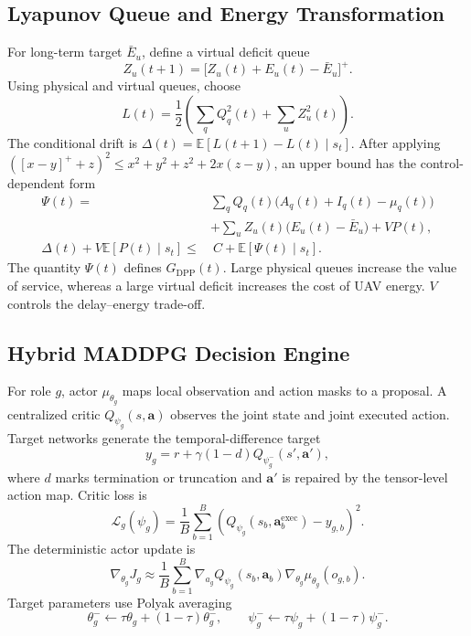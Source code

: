 \documentclass[journal]{IEEEtran}
\newcommand{\vect}[1]{\boldsymbol{#1}}
\newcommand{\E}{\mathbb{E}}
\begin{document}
\subsection{Lyapunov Queue and Energy Transformation}
For long-term target $\bar E_u$, define a virtual deficit queue
\begin{equation}
Z_u(t+1)=\big[Z_u(t)+E_u(t)-\bar E_u\big]^+.
\end{equation}
Using physical and virtual queues, choose
\begin{equation}
L(t)=\frac{1}{2}\left(\sum_q Q_q^2(t)+\sum_u Z_u^2(t)\right).
\end{equation}
The conditional drift is
$\Delta(t)=\E[L(t+1)-L(t)\mid s_t]$. After applying
$([x-y]^++z)^2\le x^2+y^2+z^2+2x(z-y)$, an upper bound has the control-dependent
form
\begin{align}
\Psi(t)=&\sum_q Q_q(t)
\big(A_q(t)+I_q(t)-\mu_q(t)\big)\nonumber\\
&+\sum_u Z_u(t)\big(E_u(t)-\bar E_u\big)+VP(t),\\
\Delta(t)+V\E[P(t)\mid s_t]
\le&\ C+\E[\Psi(t)\mid s_t].
\label{eq:dpp}
\end{align}
The quantity $\Psi(t)$ defines $G_{\mathrm{DPP}}(t)$. Large physical queues
increase the value of service, whereas a large virtual deficit increases the
cost of UAV energy. $V$ controls the delay--energy trade-off.

\subsection{Hybrid MADDPG Decision Engine}
For role $g$, actor $\mu_{\theta_g}$ maps local observation and action masks
to a proposal. A centralized critic
$Q_{\psi_g}(s,\vect a)$ observes the joint state and joint executed action.
Target networks generate the temporal-difference target
\begin{equation}
y_g=r+\gamma(1-d)Q_{\psi_g^-}
\left(s',\vect a'\right),
\end{equation}
where $d$ marks termination or truncation and $\vect a'$ is repaired by the
tensor-level action map. Critic loss is
\begin{equation}
\mathcal L_g(\psi_g)=\frac{1}{B}\sum_{b=1}^B
\left(Q_{\psi_g}(s_b,\vect a_b^{\mathrm{exec}})-y_{g,b}\right)^2.
\end{equation}
The deterministic actor update is
\begin{equation}
\nabla_{\theta_g}J_g\approx\frac{1}{B}\sum_{b=1}^B
\nabla_{a_g}Q_{\psi_g}(s_b,\vect a_b)
\nabla_{\theta_g}\mu_{\theta_g}(o_{g,b}).
\end{equation}
Target parameters use Polyak averaging
\begin{equation}
\theta_g^-\leftarrow\tau\theta_g+(1-\tau)\theta_g^-,\qquad
\psi_g^-\leftarrow\tau\psi_g+(1-\tau)\psi_g^-.
\end{equation}
\end{document}
